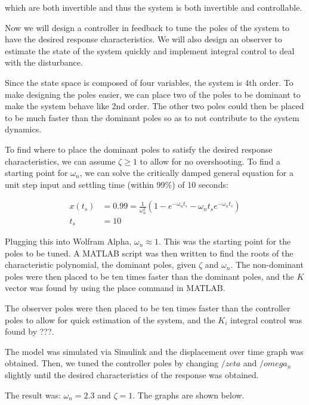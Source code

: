\documentclass[10pt]{article}
\begin{document}
which are both invertible and thus the system is both invertible and controllable.

Now we will design a controller in feedback to tune the poles of the system to have the desired response characteristics. We will also design an observer to estimate the state of the system quickly and implement integral control to deal with the disturbance. 

Since the state space is composed of four variables, the system is 4th order. To make designing the poles easier, we can place two of the poles to be dominant to make the system behave like 2nd order. The other two poles could then be placed to be much faster than the dominant poles so as to not contribute to the system dynamics. 

To find where to place the dominant poles to satisfy the desired response characteristics, we can assume $\zeta \ge 1$ to allow for no overshooting. To find a starting point for $\omega_n$, we can solve the critically damped general equation for a unit step input and settling time (within 99\%) of 10 seconds:

\begin{align*}
    x(t_s) &= 0.99 = \frac{1}{\omega_n^2}(1-e^{-\omega_nt_s} - \omega_nt_se^{-\omega_nt_s}) \\
    t_s &= 10
\end{align*}

Plugging this into Wolfram Alpha, $\omega_n \approx 1$. This was the starting point for the poles to be tuned. A MATLAB script was then written to find the roots of the characteristic polynomial, the dominant poles, given $\zeta$ and $\omega_n$. The non-dominant poles were then placed to be ten times faster than the dominant poles, and the $K$ vector was found by using the place command in MATLAB. 

The observer poles were then placed to be ten times faster than the controller poles to allow for quick estimation of the system, and the $K_i$ integral control was found by ???.

The model was simulated via Simulink and the displacement over time graph was obtained. Then, we tuned the controller poles by changing $/zeta$ and $/omega_n$ slightly until the desired characteristics of the response was obtained. 

The result was: $\omega_n = 2.3$ and $\zeta = 1$. The graphs are shown below.
\end{document}
